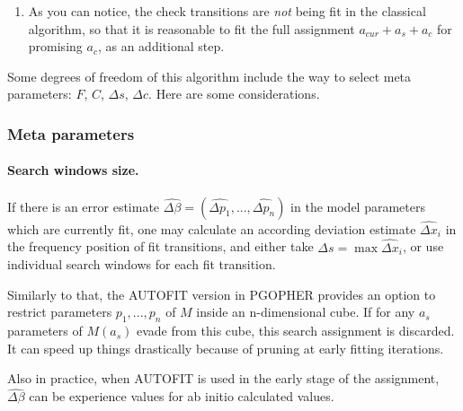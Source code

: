 \documentclass[11pt]{article}
\begin{document}
\begin{enumerate}
	\item 
	As you can notice, the check transitions are \emph{not} being fit in the classical algorithm, so that it is reasonable to fit the full assignment $a_{cur} + a_s + a_c$ for promising $a_c$, as an additional step.  
\end{enumerate}

Some degrees of freedom of this algorithm include the way to select meta parameters: $F$, $C$, $\Delta s$, $\Delta c$. Here are some considerations.

\subsubsection{Meta parameters}

\paragraph{Search windows size.}

If there is an error estimate $\widehat {\Delta \beta} = (\widehat {\Delta p_1}, ..., \widehat {\Delta p_n})$ in the model parameters which are currently fit, one may calculate an according deviation estimate $\widehat {\Delta x}_i$ in the frequency position of fit transitions, and either take $\Delta s = \max \widehat {\Delta x}_i$, or use individual search windows for each fit transition.

Similarly to that, the AUTOFIT version in PGOPHER provides an option to restrict parameters $p_1, ..., p_n$ of $M$ inside an n-dimensional cube. If for any ${a_s}$ parameters of $M({a_s})$ evade from this cube, this search assignment is discarded. It can speed up things drastically because of pruning at early fitting iterations.    



Also in practice, when AUTOFIT is used in the early stage of the assignment, $\widehat {\Delta \beta}$ can be experience values for ab initio calculated values.
\end{document}
